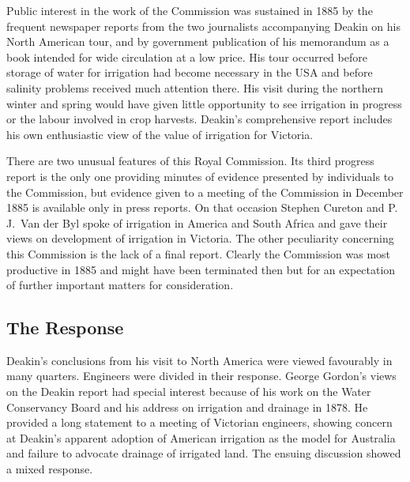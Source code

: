 Public interest in the work of the Commission was sustained in 1885 by
the frequent newspaper reports from the two journalists accompanying
Deakin on his North American tour, and by government publication of
his memorandum as a book intended for wide circulation at a low price.
His tour occurred before storage of water for irrigation had become
necessary in the USA and before salinity  problems
received much attention there.  His visit during the northern winter
and spring would have given little opportunity to see irrigation in
progress or the labour involved in crop harvests.  Deakin's
comprehensive report includes his own enthusiastic view of the value
of irrigation for Victoria.

There are two unusual features of this Royal Commission.  Its third
progress report is the only one providing minutes of evidence
presented by individuals to the Commission, but evidence given to a
meeting of the Commission in December 1885 is available only in press
reports.  On that occasion Stephen Cureton and P.\,J.~Van der Byl
spoke of irrigation in America  and South Africa
 and gave their views on development of irrigation
in Victoria.  The other peculiarity concerning this Commission is the
lack of a final report.  Clearly the Commission was most productive in
1885 and might have been terminated then but for an expectation of
further important matters for consideration.

\subsection*{The Response}

Deakin's  conclusions from his visit to North
America were viewed favourably in many quarters.  Engineers were
divided in their response.  George Gordon's  views
on the Deakin report had special interest because of his work on the
Water Conservancy Board and his address on irrigation and drainage in
1878.  He provided a long statement to a meeting of Victorian
engineers, showing concern at Deakin's apparent adoption of American
irrigation as the model for Australia and failure to advocate drainage
of irrigated land.  The ensuing discussion showed a mixed
response.

